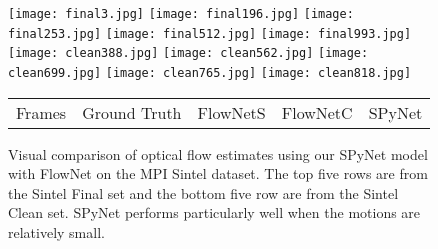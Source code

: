 \documentclass[10pt,twocolumn,letterpaper]{article}
\begin{document}
\begin{figure*}
\begin{center}
\texttt{[image: final3.jpg]}
\texttt{[image: final196.jpg]}
\texttt{[image: final253.jpg]}
\texttt{[image: final512.jpg]}
\texttt{[image: final993.jpg]}
\texttt{[image: clean388.jpg]}
\texttt{[image: clean562.jpg]}
\texttt{[image: clean699.jpg]}
\texttt{[image: clean765.jpg]}
\texttt{[image: clean818.jpg]}
\begin{tabular}{C{0.2\textwidth}C{0.16\textwidth}C{0.16\textwidth}C{0.16\textwidth}C{0.2\textwidth}}
Frames & Ground Truth & FlowNetS & FlowNetC & SPyNet \\
 \end{tabular}
\end{center}
\vspace{-0.1in}
\caption{Visual comparison of optical flow estimates using our  SPyNet model with FlowNet on the MPI Sintel dataset. The top five rows are from the  Sintel Final set and the bottom five row are from the Sintel Clean set.
SPyNet performs particularly well when the motions are relatively small.
}
\label{fig:sintelresults}
\end{figure*}
\end{document}
